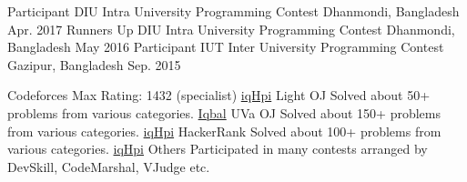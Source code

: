 \newcommand*{\myLink}{\headersocialstyle{\faExternalLink}}


\begin{cvhonors}
  \cvhonor
    {Participant}
    {DIU Intra University Programming Contest}
    {Dhanmondi, Bangladesh}
    {Apr. 2017}
  \cvhonor
    {Runners Up}
    {DIU Intra University Programming Contest}
    {Dhanmondi, Bangladesh}
    {May 2016}
  \cvhonor
    {Participant}
    {IUT Inter University Programming Contest}
    {Gazipur, Bangladesh}
    {Sep. 2015}
\end{cvhonors}

\begin{cvhonors}
  \cvhonor
    {Codeforces}
    {Max Rating: 1432 (specialist)}
    {}
    {\href{http://codeforces.com/profile/iqHpi}{{\myLink} iqHpi}}
  \cvhonor
    {Light OJ}
    {Solved about 50+ problems from various categories.}
    {}
    {\href{http://www.lightoj.com/volume_userstat.php?user_id=19475}{{\myLink} Iqbal}}
  \cvhonor
    {UVa OJ}
    {Solved about 150+ problems from various categories.}
    {}
    {\href{http://uhunt.felix-halim.net/id/553883}{{\myLink} iqHpi}}
  \cvhonor
    {HackerRank}
    {Solved about 100+ problems from various categories.}
    {}
    {\href{https://www.hackerrank.com/iqHpi}{{\myLink} iqHpi}}    
  \cvhonor
    {Others}
    {Participated in many contests arranged by DevSkill, CodeMarshal, VJudge etc.}
    {}
    {}
\end{cvhonors}
